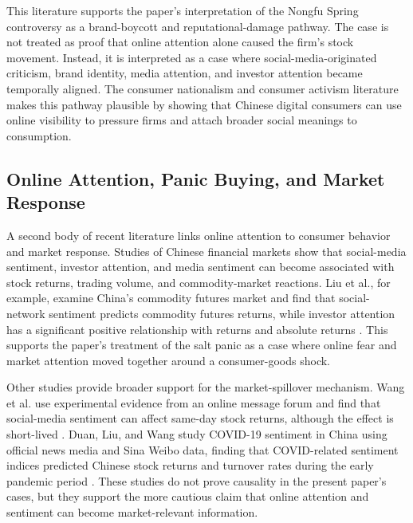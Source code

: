 \documentclass[conference]{IEEEtran}
\begin{document}
This literature supports the paper's interpretation of the Nongfu Spring controversy as a brand-boycott and reputational-damage pathway. The case is not treated as proof that online attention alone caused the firm's stock movement. Instead, it is interpreted as a case where social-media-originated criticism, brand identity, media attention, and investor attention became temporally aligned. The consumer nationalism and consumer activism literature makes this pathway plausible by showing that Chinese digital consumers can use online visibility to pressure firms and attach broader social meanings to consumption.

\subsection{Online Attention, Panic Buying, and Market Response}

A second body of recent literature links online attention to consumer behavior and market response. Studies of Chinese financial markets show that social-media sentiment, investor attention, and media sentiment can become associated with stock returns, trading volume, and commodity-market reactions. Liu et al., for example, examine China's commodity futures market and find that social-network sentiment predicts commodity futures returns, while investor attention has a significant positive relationship with returns and absolute returns \cite{liu2023commodity}. This supports the paper's treatment of the salt panic as a case where online fear and market attention moved together around a consumer-goods shock.

Other studies provide broader support for the market-spillover mechanism. Wang et al. use experimental evidence from an online message forum and find that social-media sentiment can affect same-day stock returns, although the effect is short-lived \cite{wang2022sentiment}. Duan, Liu, and Wang study COVID-19 sentiment in China using official news media and Sina Weibo data, finding that COVID-related sentiment indices predicted Chinese stock returns and turnover rates during the early pandemic period \cite{duan2021covid}. These studies do not prove causality in the present paper's cases, but they support the more cautious claim that online attention and sentiment can become market-relevant information.
\end{document}
